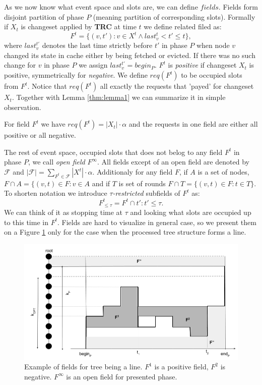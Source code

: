 As we now know what event space and slots are, we can define $fields$. Fields 
form disjoint partition of phase $P$ (meaning partition of corresponding 
slots). Formally if $X_t$ is changeset applied by \textbf{TRC} at time $t$ we 
define related filed as:
$$ F^t = \{(v, t'): v \in X^t \wedge last_v^t < t' \leq t\},$$
where $last_v^{t'}$ denotes the last time strictly before $t'$ in phase $P$ 
when node $v$ changed its state in cache either by being fetched or evicted. If 
there was no such change for $v$ in phase $P$ we assign $last_v^{t'} = begin_P$.
$F^t$ is \textit{positive} if changeset $X_t$ is positive, symmetrically for 
\textit{negative}. We define $req(F^t)$ to be occupied slots from $F^t$. Notice 
that $req(F^t)$ all exactly the requests that 'payed' for changeset $X_t$. 
Together with Lemma \ref{thm:lemma1} we can summarize it in simple observation.
\begin{observe}
For field $F^t$ we have $req(F^t) = |X_t| \cdot \alpha$ and the requests 
in one field are either all positive or all negative.
\label{obs:observe1}
\end{observe}
The rest of event space, occupied slots that does not belog to any field $F^t$ 
in phase $P$, we call \textit{open field} $F^{\infty}$. All fields except of 
an 
open field are denoted by $\mathcal{F}$ and $|\mathcal{F}| = \sum_{F^t \in 
\mathcal{F}} |X^t| \cdot \alpha$.
Additionaly for any field $F$, if $A$ is a set of nodes, $F \cap A = \{(v,t) 
\in F: v \in A$ and if $T$ is set of rounds $F \cap T = \{(v, t) \in F: t \in 
T\}$. To shorten notation we introduce $\tau$\textit{-restricted} subfields of 
$F^t$ as:
$$F^t_{\leq \tau} = F^t \cap {t': t' \leq \tau}.$$
We can think of it as stopping time at $\tau$ and looking what slots are 
occupied up to this time in $F^t$.
Fields are hard to visualize in general case, so we present them on a 
Figure \ref{fig:fields} only for the case when the processed tree structure 
forms a line.
\begin{figure}
\label{fig:fields}
\begin{center}
  \includegraphics[width=1.1\textwidth]{fields.png}
\end{center}
\caption{Example of fields for tree being a line. $F^1$ is a positive field, 
$F^2$ is negative. $F^{\infty}$ is an open field for presented phase.}
\end{figure}

